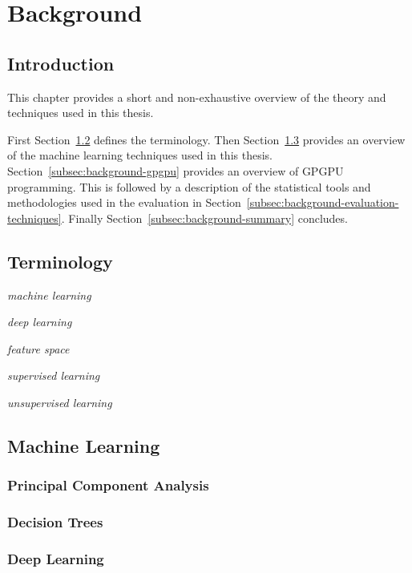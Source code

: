 \chapter{Background}
\label{chap:background}

\section{Introduction}

This chapter provides a short and non-exhaustive overview of the theory and techniques used in this thesis.

First Section~\ref{subsec:background-terminology} defines the terminology. Then Section~\ref{subsec:background-machine-learning} provides an overview of the machine learning techniques used in this thesis. Section~\ref{subsec:background-gpgpu} provides an overview of GPGPU programming. This is followed by a description of the statistical tools and methodologies used in the evaluation in Section~\ref{subsec:background-evaluation-techniques}. Finally Section~\ref{subsec:background-summary} concludes.

\section{Terminology}
\label{subsec:background-terminology}

\emph{machine learning}

\emph{deep learning}

\emph{feature space}

\emph{supervised learning}

\emph{unsupervised learning}


\section{Machine Learning}
\label{subsec:background-machine-learning}

\subsection{Principal Component Analysis}

\subsection{Decision Trees}

\subsection{Deep Learning}

